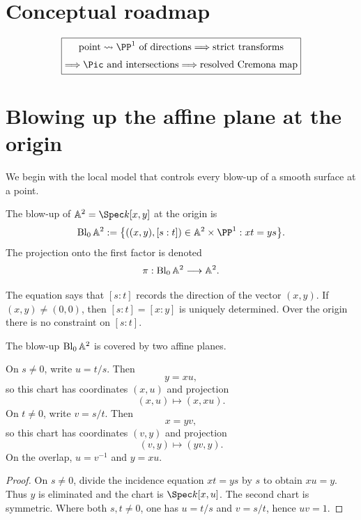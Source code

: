 \section*{Conceptual roadmap}
\[
\boxed{\begin{gathered}
\text{point}\rightsquigarrow\PP^1\text{ of directions}
\Longrightarrow
\text{strict transforms}\\[0.3em]
\Longrightarrow
\Pic\text{ and intersections}
\Longrightarrow
\text{resolved Cremona map}
\end{gathered}}
\]


\section{Blowing up the affine plane at the origin}

We begin with the local model that controls every blow-up of a smooth surface at a point.

\begin{definition}\label{def:vi45-incidence-blowup}
The blow-up of \(\mathbb A^2=\Spec k[x,y]\) at the origin is
\[
  \Bl_0\mathbb A^2
  :=\bigl\{((x,y),[s:t])\in\mathbb A^2\times\PP^1:xt=ys\bigr\}.
\]
The projection onto the first factor is denoted
\[
  \pi:\operatorname{Bl}_0\mathbb A^2\longrightarrow\mathbb A^2.
\]
\end{definition}

The equation says that \([s:t]\) records the direction of the vector \((x,y)\).  If \((x,y)\neq(0,0)\), then \([s:t]=[x:y]\) is uniquely determined.  Over the origin there is no constraint on \([s:t]\).

\begin{proposition}
The blow-up \(\operatorname{Bl}_0\mathbb A^2\) is covered by two affine planes.

On \(s\neq0\), write \(u=t/s\).  Then
\[
  y=xu,
\]
so this chart has coordinates \((x,u)\) and projection
\[
  (x,u)\longmapsto(x,xu).
\]
On \(t\neq0\), write \(v=s/t\).  Then
\[
  x=yv,
\]
so this chart has coordinates \((v,y)\) and projection
\[
  (v,y)\longmapsto(yv,y).
\]
On the overlap, \(u=v^{-1}\) and \(y=xu\).
\end{proposition}

\begin{proof}
On \(s\neq0\), divide the incidence equation \(xt=ys\) by \(s\) to obtain \(xu=y\).  Thus \(y\) is eliminated and the chart is \(\Spec k[x,u]\).  The second chart is symmetric.  Where both \(s,t\neq0\), one has \(u=t/s\) and \(v=s/t\), hence \(uv=1\).
\end{proof}

